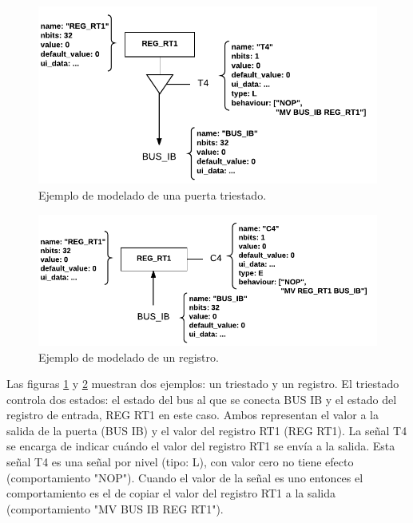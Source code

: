 \begin{figure}[htbp]
 	\centering
 	\includegraphics[width=14cm]{figures/hardware_example_tristate}
 	\caption{Ejemplo de modelado de una puerta triestado.}
	\label{fig:hardware_tristate_example}
\end{figure}

\begin{figure}[htbp]
 	\centering
 	\includegraphics[width=14cm]{figures/hardware_example_register}
 	\caption{Ejemplo de modelado de un registro.}
	\label{fig:hardware_register_example}
\end{figure}

Las figuras \ref{fig:hardware_tristate_example} y \ref{fig:hardware_register_example} muestran dos ejemplos: un triestado y un registro.
El triestado controla dos estados: el estado del bus al que se conecta BUS IB y el estado del registro de entrada, REG RT1 en este caso. Ambos representan el valor a la salida de la puerta (BUS IB) y el valor del registro RT1 (REG RT1). La señal T4 se encarga de indicar cuándo el valor del registro RT1 se envía a la salida. Esta señal T4 es una señal por nivel (tipo: L), con valor cero no tiene efecto (comportamiento "NOP"). Cuando el valor de la señal es uno entonces el comportamiento es el de copiar el valor del registro RT1 a la salida (comportamiento "MV BUS IB REG RT1").

